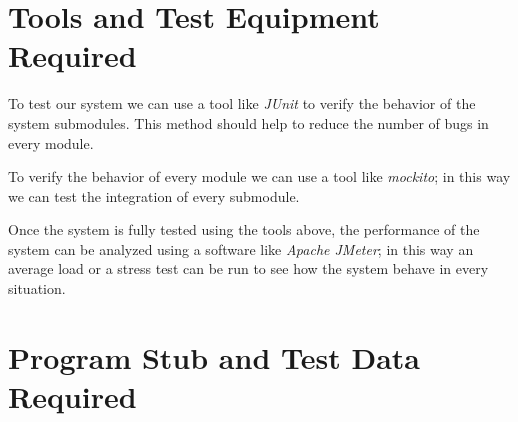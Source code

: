 \section{Tools and Test Equipment Required}
	To test our system we can use a tool like \textit{JUnit} to verify the behavior of the system submodules. This method should help to reduce the number of bugs in every module.
	
	To verify the behavior of every module we can use a tool like \textit{mockito}; in this way we can test the integration of every submodule.
	
	Once the system is fully tested using the tools above, the performance of the system can be analyzed using a software like \textit{Apache JMeter}; in this way an average load or a stress test can be run to see how the system behave in every situation.
\section{Program Stub and Test Data Required}
